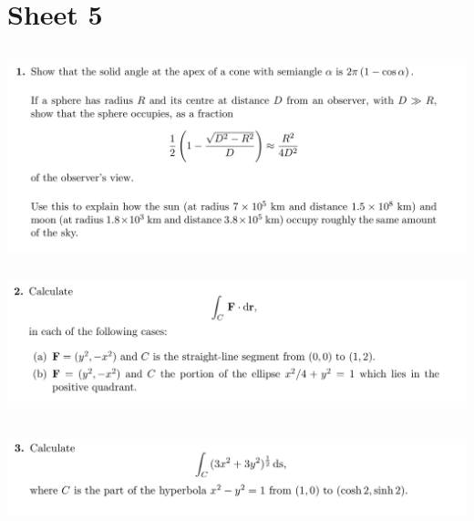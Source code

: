 \documentclass[12pt]{article}
\begin{document}
\newpage
\section{Sheet 5}

\subsection{}
\begin{mdframed}
  \includegraphics[width=400pt]{img/oxford-prelims-M5-multivariable-calc-5-1.png}
\end{mdframed}

\subsection{}
\begin{mdframed}
  \includegraphics[width=400pt]{img/oxford-prelims-M5-multivariable-calc-5-2.png}
\end{mdframed}

\subsection{}
\begin{mdframed}
  \includegraphics[width=400pt]{img/oxford-prelims-M5-multivariable-calc-5-3.png}
\end{mdframed}
\end{document}
